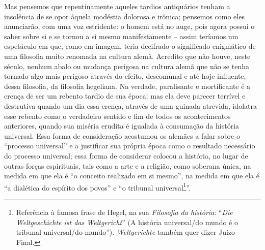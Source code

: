 Mas pensemos que repentinamente aqueles tardios antiquários tenham a
insolência de se opor àquela modéstia dolorosa e irônica; pensemos como
eles anunciarão, com uma voz estridente: o homem está no auge, pois
agora possui o saber sobre si e se tornou a si mesmo manifestamente --
assim teríamos um espetáculo em que, como em imagem, teria decifrado o
significado enigmático de uma filosofia muito renomada na cultura alemã.
Acredito que não houve, neste século, nenhum abalo ou mudança perigosa
na cultura alemã que não se tenha tornado algo mais perigoso através do
efeito, descomunal e até hoje influente, dessa filosofia, da filosofia
hegeliana. Na verdade, paralisante e mortificante é a crença de ser um
rebento tardio de sua época: mas ela deve parecer terrível e destrutiva
quando um dia essa crença, através de uma guinada atrevida, idolatra
esse rebento como o verdadeiro sentido e fim de todos os acontecimentos
anteriores, quando sua miséria erudita é igualada à consumação da
história universal. Essa forma de consideração acostumou os alemães a
falar sobre o ``processo universal'' e a justificar sua própria época
como o resultado necessário do processo universal; essa forma de
considerar colocou a história, no lugar de outras forças espirituais,
tais como a arte e a religião, como soberana única, na medida em que ela
é ``o conceito realizado em si mesmo'', na medida em que ela é ``a
dialética do espírito dos povos'' e ``o tribunal universal\footnote{Referência
  à famosa frase de Hegel, na sua \emph{Filosofia da história}:
  ``\emph{Die Weltgeschichte ist das Weltgericht}'' (A história
  universal/do mundo é o tribunal universal/do mundo'').
  \emph{Weltgerichte} também quer dizer Juízo Final.}''.

